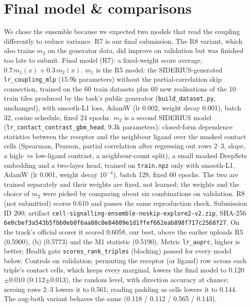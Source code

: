 \documentclass{article}
\begin{document}
\section{Final model \& comparisons}
We chose the ensemble because we expected two models that read the coupling differently to reduce variance. R7
is our final submission. The R8 variant, which also trains $m_2$ on the generator data, did improve on validation
but was finished too late to submit.
Final model (R7): a fixed-weight score average, $0.7\,m_1(x) + 0.3\,m_2(x)$. $m_1$ is the R5 model: the
SIDERIUS-generated \texttt{lr\_coupling\_mlp} (15.9k parameters) without the partial-correlation skip connection,
trained on the 60 train datasets plus 60 new realisations of the 10 train tiles produced by the task's public
generator (\texttt{build\_dataset.py}, unchanged), with smooth-L1
loss, AdamW (lr 0.002, weight decay 0.001), batch 32, cosine schedule, fixed 24 epochs. $m_2$ is a second
SIDERIUS model (\texttt{lr\_contact\_contrast\_gbm\_head}, 9.3k parameters): closed-form dependence statistics
between the receptor and the neighbour ligand over the masked contact cells (Spearman, Pearson, partial
correlation after regressing out rows 2--3, slope, a high- vs low-ligand contrast, a neighbour-count split),
a small masked DeepSets embedding and a two-layer head, trained on \texttt{train.npz} only with smooth-L1, AdamW
(lr 0.001, weight decay $10^{-4}$), batch 128, fixed 60 epochs. The two are trained separately and their weights
are fixed, not learned; the weights and the choice of $m_2$ were picked by comparing about six combinations on
validation. R8 (not submitted) scores 0.610 and passes the same reproduction check. Submission ID 200; artifact
\texttt{cell-signalling-ensemble-noskip-explore2-v2.zip}, SHA-256
\texttt{6e0cbef3a543b5fbb0eb0f6aa88c0e84809e1d1ffef662eab898f717c2568f27}. On the track's official scorer it
scored 0.6058, our best, above the earlier uploads R5 (0.5900), (b) (0.5773) and the M1 statistic (0.5190).
Metric \texttt{lr\_auprc}, higher is better; Health gate \texttt{scores\_rank\_triples} (blocking) passed for
every model below. Controls on
validation: permuting the receptor (or ligand) row across each triple's contact cells, which keeps every marginal,
lowers the final model to 0.120$\pm$0.010 (0.112$\pm$0.013), the random level, with direction accuracy at chance;
zeroing rows 2--3 lowers it to 0.561; reading padding as cells lowers it to 0.144. The aug-both
variant behaves the same (0.118 / 0.112 / 0.565 / 0.143).
\end{document}
